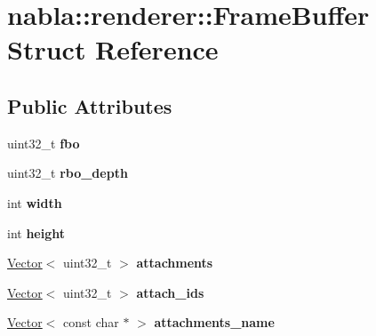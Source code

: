 \hypertarget{structnabla_1_1renderer_1_1_frame_buffer}{}\section{nabla\+::renderer\+::Frame\+Buffer Struct Reference}
\label{structnabla_1_1renderer_1_1_frame_buffer}
\subsection*{Public Attributes}
\begin{DoxyCompactItemize}
\item 
\mbox{\label{structnabla_1_1renderer_1_1_frame_buffer_a25380b942a1a1940c5571be52da049d0}} 
uint32\+\_\+t {\bfseries fbo}
\item 
\mbox{\label{structnabla_1_1renderer_1_1_frame_buffer_ab191775ab5b732fb4eb51490a1c89494}} 
uint32\+\_\+t {\bfseries rbo\+\_\+depth}
\item 
\mbox{\label{structnabla_1_1renderer_1_1_frame_buffer_a983ec88a47e1a94db89c2b450fca93d7}} 
int {\bfseries width}
\item 
\mbox{\label{structnabla_1_1renderer_1_1_frame_buffer_a748e53516033557b5f543dee474f0153}} 
int {\bfseries height}
\item 
\mbox{\label{structnabla_1_1renderer_1_1_frame_buffer_a83df6cb605d05422c7f9aebbe3be3b69}} 
\mbox{\hyperlink{classnabla_1_1_s_t_l_vector_ex}{Vector}}$<$ uint32\+\_\+t $>$ {\bfseries attachments}
\item 
\mbox{\label{structnabla_1_1renderer_1_1_frame_buffer_a72e280b8e2429dbb37abd820951c5929}} 
\mbox{\hyperlink{classnabla_1_1_s_t_l_vector_ex}{Vector}}$<$ uint32\+\_\+t $>$ {\bfseries attach\+\_\+ids}
\item 
\mbox{\label{structnabla_1_1renderer_1_1_frame_buffer_a580a99dd20ca07234b7209d26d6de5b9}} 
\mbox{\hyperlink{classnabla_1_1_s_t_l_vector_ex}{Vector}}$<$ const char $\ast$ $>$ {\bfseries attachments\+\_\+name}

\end{DoxyCompactItemize}
